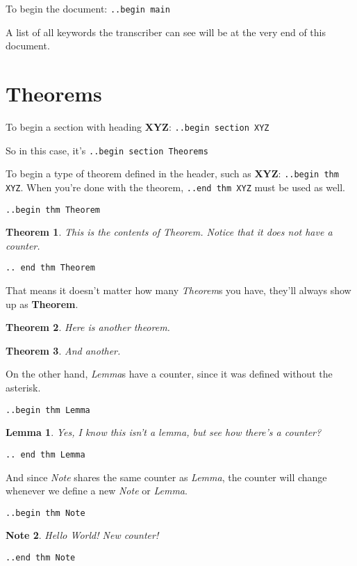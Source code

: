 \documentclass[12pt]{article}
\newtheorem*{Theorem}{Theorem}
\newtheorem{Lemma}{Lemma}
\newtheorem{Note}[Lemma]{Note}
\begin{document}
\begin{flushleft}
To begin the document: \verb|..begin main|

A list of all keywords the transcriber can see will be at the very end of this document.

\medskip

\section{Theorems}
To begin a section with heading \textbf{XYZ}: \verb|..begin section XYZ|

So in this case, it's \verb|..begin section Theorems|

\bigskip

To begin a type of theorem defined in the header, such as \textbf{XYZ}: \verb|..begin thm XYZ|. When you're done with the theorem, \verb|..end thm XYZ| must be used as well.

\medskip

\verb|..begin thm Theorem|
\begin{Theorem}
This is the contents of Theorem. Notice that it does not have a counter.
\end{Theorem}
\verb|.. end thm Theorem|

\medskip

That means it doesn't matter how many \emph{Theorem}s you have, they'll always show up as \textbf{Theorem}.

\begin{Theorem}
Here is another theorem.
\end{Theorem}

\begin{Theorem}
And another.
\end{Theorem}

On the other hand, \emph{Lemma}s have a counter, since it was defined without the asterisk.

\medskip
\verb|..begin thm Lemma|
\begin{Lemma}
Yes, I know this isn't a lemma, but see how there's a counter?
\end{Lemma}
\verb|.. end thm Lemma|
\medskip

And since \emph{Note} shares the same counter as \emph{Lemma}, the counter will change whenever we define
a new \emph{Note} or \emph{Lemma}.

\medskip
\verb|..begin thm Note|
\begin{Note}
Hello World! New counter!
\end{Note}
\verb|..end thm Note|
\medskip


\end{flushleft}
\end{document}
